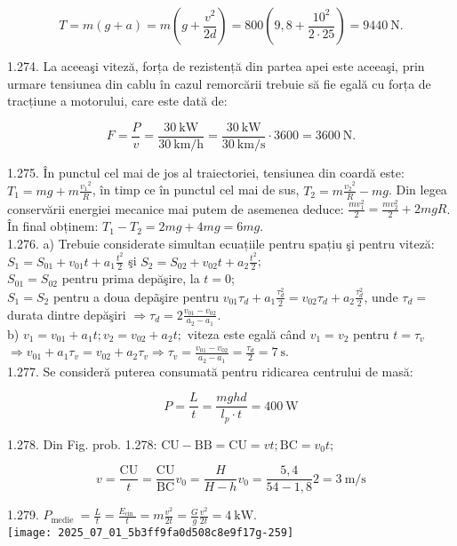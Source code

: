 $$
T=m(g+a)=m\left(g+\frac{v^{2}}{2 d}\right)=800\left(9,8+\frac{10^{2}}{2 \cdot 25}\right)=9440 \mathrm{~N} .
$$

1.274. La aceeaşi viteză, forța de rezistență din partea apei este aceeaşi, prin urmare tensiunea din cablu în cazul remorcării trebuie să fie egală cu forța de tracțiune a motorului, care este dată de:

$$
F=\frac{P}{v}=\frac{30 \mathrm{~kW}}{30 \mathrm{~km} / \mathrm{h}}=\frac{30 \mathrm{~kW}}{30 \mathrm{~km} / \mathrm{s}} \cdot 3600=3600 \mathrm{~N} .
$$

1.275. În punctul cel mai de jos al traiectoriei, tensiunea din coardă este: $T_{1}=m g+m \frac{v_{1}{ }^{2}}{R}$, în timp ce în punctul cel mai de sus, $T_{2}=m \frac{v_{2}{ }^{2}}{R}-m g$. Din legea conservării energiei mecanice mai putem de asemenea deduce: $\frac{m v_{1}^{2}}{2}=\frac{m v_{2}^{2}}{2}+2 m g R$. În final obținem: $T_{1}-T_{2}=2 m g+4 m g=6 m g$.\\
1.276. a) Trebuie considerate simultan ecuațiile pentru spațiu şi pentru viteză:\\
$S_{1}=S_{01}+v_{01} t+a_{1} \frac{t^{2}}{2}$ şi $S_{2}=S_{02}+v_{02} t+a_{2} \frac{t^{2}}{2}$;\\
$S_{01}=S_{02}$ pentru prima depăşire, la $t=0$;\\
$S_{1}=S_{2}$ pentru a doua depãşire pentru $v_{01} \tau_{d}+a_{1} \frac{\tau_{d}^{2}}{2}=v_{02} \tau_{d}+a_{2} \frac{\tau_{d}^{2}}{2}$, unde $\tau_{d}=$ durata dintre depăşiri $\Rightarrow \tau_{d}=2 \frac{v_{01}-v_{02}}{a_{2}-a_{1}}$.\\
b) $v_{1}=v_{01}+a_{1} t ; v_{2}=v_{02}+a_{2} t ;$ viteza este egală când $v_{1}=v_{2}$ pentru $t=\tau_{v}$ $\Rightarrow v_{01}+a_{1} \tau_{v}=v_{02}+a_{2} \tau_{v} \Rightarrow \tau_{v}=\frac{v_{01}-v_{02}}{a_{2}-a_{1}}=\frac{\tau_{d}}{2}=7 \mathrm{~s}$.\\
1.277. Se consideră puterea consumată pentru ridicarea centrului de masă:

$$
P=\frac{L}{t}=\frac{m g h d}{l_{p} \cdot t}=400 \mathrm{~W}
$$

1.278. Din Fig. prob. 1.278: $\mathrm{CU}-\mathrm{BB}=\mathrm{CU}=v t ; \mathrm{BC}=v_{0} t$;

$$
v=\frac{\mathrm{CU}}{t}=\frac{\mathrm{CU}}{\mathrm{BC}} v_{0}=\frac{H}{H-h} v_{0}=\frac{5,4}{54-1,8} 2=3 \mathrm{~m} / \mathrm{s}
$$

1.279. $P_{\text {medie }}=\frac{L}{t}=\frac{E_{\text {cin }}}{t}=m \frac{v^{2}}{2 t}=\frac{G}{g} \frac{v^{2}}{2 t}=4 \mathrm{~kW}$.\\
\texttt{[image: 2025\_07\_01\_5b3ff9fa0d508c8e9f17g-259]}

